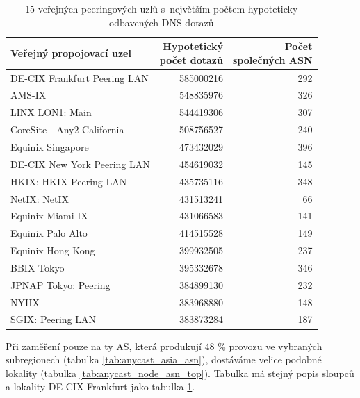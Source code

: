\documentclass[thesis=M,czech]{src/FITthesis}[2019/12/23]
\begin{document}
\begin{table}
\centering
\begin{tabular}{lrr}
\toprule
     Veřejný propojovací uzel  &  \makecell{Hypotetický\\počet dotazů} &  \makecell{Počet\\ společných ASN} \\
\midrule
                  DE-CIX Frankfurt Peering LAN &  585000216 & 292 \\
                                        AMS-IX &  548835976 & 326 \\
                               LINX LON1: Main &  544419306 & 307 \\
                    CoreSite - Any2 California &  508756527 & 240 \\
                             Equinix Singapore &  473432029 & 396 \\
                   DE-CIX New York Peering LAN &  454619032 & 145 \\
                        HKIX: HKIX Peering LAN &  435735116 & 348 \\
                                  NetIX: NetIX &  431513241 &  66 \\
                              Equinix Miami IX &  431066583 & 141 \\
                             Equinix Palo Alto &  414515528 & 149 \\
                             Equinix Hong Kong &  399932505 & 237 \\
                                    BBIX Tokyo &  395332678 & 346 \\
                          JPNAP Tokyo: Peering &  384899130 & 232 \\
                                         NYIIX &  383968880 & 148 \\
                             SGIX: Peering LAN &  383873284 & 187 \\


\bottomrule
\end{tabular}
 	\caption[]{15 veřejných peeringových uzlů s~největším počtem hypoteticky odbavených DNS dotazů} 
 	\label{tab:anycast_node_asn}
\end{table}

Při zaměření pouze na ty AS, která produkují 48 \% provozu ve vybraných subregionech (tabulka \ref{tab:anycast_asia_asn}), dostáváme velice podobné lokality (tabulka \ref{tab:anycast_node_asn_top}). Tabulka má stejný popis sloupců a lokality DE-CIX Frankfurt jako tabulka \ref{tab:anycast_node_asn}. 
\end{document}
